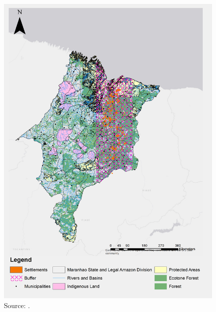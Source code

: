 \begin{figure}[H]
  \centering
  \includegraphics[width=1\textwidth, inner]{Chapter2/MaranhaoChapter2_Fig3.png}
\caption{Source: \citep{MMMAwebsite,nugeo_2018,embrapa_2018, INCRA}.}
\label{fig:delimitacaosett}
\end{figure}

